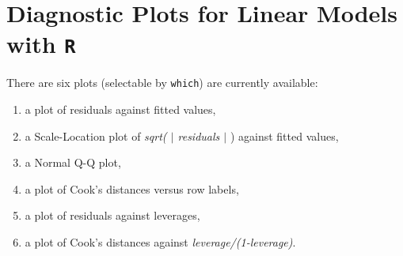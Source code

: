 \documentclass[residuals.tex]{subfiles}
\begin{document}
\Large
\newpage
\section{Diagnostic Plots for Linear Models with \texttt{R}}

There are six plots (selectable by \texttt{which}) are currently available: 
\begin{enumerate}
	\item a plot of residuals against fitted values, 
	\item a Scale-Location plot of \textit{sqrt( $|$ residuals $|$ }) against fitted values, 
	\item a Normal Q-Q plot, 
	\item a plot of Cook's distances versus row labels, 
	\item a plot of residuals against leverages, 
	\item a plot of Cook's distances against \textit{leverage/(1-leverage)}.
\end{enumerate} 
\end{document}
